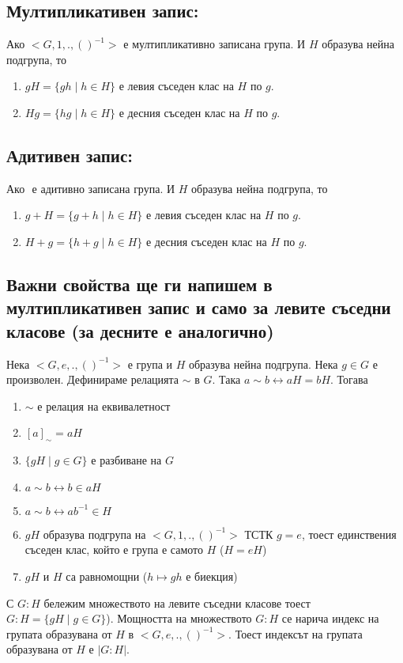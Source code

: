 \documentclass[12pt]{article}
\begin{document}
\subsection{Мултипликативен запис:}
Ако \(<G, 1, . , ()^{-1}>\) е мултипликативно записана група.
И \(H\) образува нейна подгрупа, то 
\begin{enumerate}
    \item \(gH = \{gh \; | \; h \in H\}\) е левия съседен клас на \(H\) по \(g\).
    \item \(Hg = \{hg \; | \; h \in H\}\) е десния съседен клас на \(H\) по \(g\).
\end{enumerate}
\subsection{Адитивен запис:}
Ако \(<G, 0, + , ->\) е адитивно записана група.
И \(H\) образува нейна подгрупа, то 
\begin{enumerate}
    \item \(g + H = \{g + h \; | \; h \in H\}\) е левия съседен клас на \(H\) по \(g\).
    \item \(H + g = \{h + g \; | \; h \in H\}\) е десния съседен клас на \(H\) по \(g\).
\end{enumerate}
\subsection{Важни свойства ще ги напишем в мултипликативен запис и само за левите съседни класове (за десните е аналогично)}
Нека \(<G, e, . , ()^{-1}>\) е група и \(H\) образува нейна подгрупа.
Нека \(g \in G\) е произволен.
Дефинираме релацията \(\sim\) в \(G\). Така \(a \sim b \longleftrightarrow aH = bH\). Тогава
\begin{enumerate}
    \item \(\sim\) е релация на еквивалетност
    \item \([a]_\sim = aH\)
    \item \(\{gH \; | \; g \in G\}\) е разбиване на \(G\)
    \item \(a \sim b \longleftrightarrow b \in aH\)
    \item \(a \sim b \longleftrightarrow ab^{-1} \in H\)
    \item \(gH\) образува подгрупа на \(<G, 1, . , ()^{-1}>\) ТСТК \(g = e\),
    тоест единствения съседен клас, който е група е самото \(H\) (\(H = eH\))
    \item \(gH\) и \(H\) са равномощни (\(h \mapsto gh\) е биекция)
\end{enumerate}
С \(G : H\) бележим множеството на левите съседни класове тоест \(G : H = \{gH \; | \; g \in G\}\)). Мощността на множеството \(G : H\) се нарича индекс на групата образувана от \(H\) в \(<G, e, . , ()^{-1}>\). Тоест индексът на групата образувана от \(H\) е \(|G : H|\).
\end{document}
